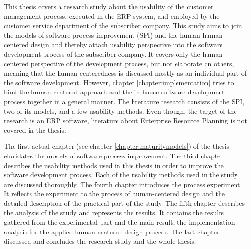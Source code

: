 \documentclass[12pt,a4paper,oneside,pdftex]{report}
\begin{document}
This thesis covers a research study about the usability of the customer management process, executed in the ERP system, and employed by the customer service department of the subscriber company. This study aims to join the models of software process improvement (SPI) and the human-human centered design and thereby attach usability perspective into the software development process of the subscriber company. It covers only the human-centered perspective of the development process, but not elaborate on others, meaning that the human-centeredness is discussed mostly as an individual part of the software development. However, chapter \ref{chapter:implementation} tries to bind the human-centered approach and the in-house software development process together in a general manner. The literature research consists of the SPI, two of its models, and a few usability methods. Even though, the target of the research is an ERP software, literature about Enterprise Resource Planning is not covered in the thesis.

The first actual chapter (see chapter \ref{chapter:maturitymodels}) of the thesis elucidates the models of software process improvement. The third chapter describes the usability methods used in this thesis in order to improve the software development process. Each of the usability methods used in the study are discussed thoroughly. The fourth chapter introduces the process experiment. It reflects the experiment to the process of human-centered design and the detailed description of the practical part of the study. The fifth chapter describes the analysis of the study and represents the results. It contains the results gathered from the experimental part and the main result, the implementation analysis for the applied human-centered design process. The last chapter discussed and concludes the research study and the whole thesis.

    
    





\end{document}
